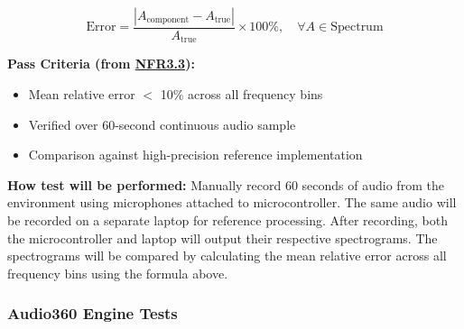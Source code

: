 \documentclass[12pt, titlepage]{article}
\begin{document}
\begin{enumerate}
\[
\text{Error} = \frac{\left|A_{\text{component}} - 
A_{\text{true}}\right|}{A_{\text{true}}} \times 100\%, 
\quad \forall A \in \text{Spectrum}
\]

\textbf{Pass Criteria (from \hyperref[SRS-NFR3_3]{NFR3.3}):}
\begin{itemize}
\item Mean relative error $<$ 10\% across all frequency bins
\item Verified over 60-second continuous audio sample
\item Comparison against high-precision reference implementation
\end{itemize}

\textbf{How test will be performed:} 
Manually record 60 seconds of audio from the environment using microphones
attached to microcontroller. The same audio will be recorded on a separate
laptop for reference processing. After recording, both the microcontroller and
laptop will output their respective spectrograms. The spectrograms will be
compared by calculating the mean relative error across all frequency bins using
the formula above.

\end{enumerate}
		
\subsubsection{Audio360 Engine Tests}
\end{document}
